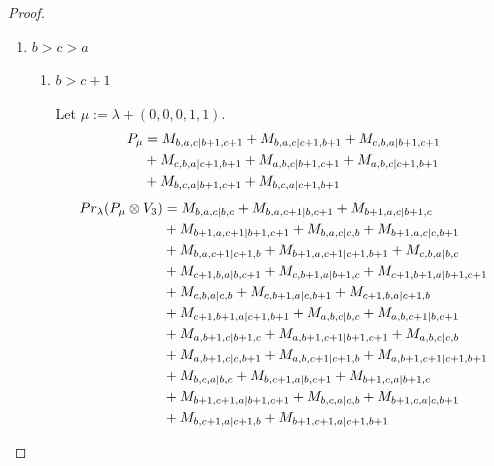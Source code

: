 \begin{proof}
\begin{enumerate}
  \item $b>c>a$
    \begin{enumerate}
      \item $b>c+1$ \par
        Let $\mu:=\lambda + (0,0,0,1,1) $.
        \begin{equation}\notag
          \begin{aligned}
            P_\mu &= M_{b,a,c|b+1,c+1}
+ M_{b,a,c|c+1,b+1}
+ M_{c,b,a|b+1,c+1}\\
                                            &
+ M_{c,b,a|c+1,b+1}
+ M_{a,b,c|b+1,c+1}
+ M_{a,b,c|c+1,b+1}\\
                                            &
+ M_{b,c,a|b+1,c+1}
+ M_{b,c,a|c+1,b+1}
          \end{aligned}
        \end{equation}
        \begin{equation}\notag
          \begin{aligned}
            Pr_{\lambda}(P_\mu \otimes V_{3}) &=
M_{b,a,c|b,c}
+ M_{b,a,c+1|b,c+1}
+ M_{b+1,a,c|b+1,c}\\
                                            &
+ M_{b+1,a,c+1|b+1,c+1}
+ M_{b,a,c|c,b}
+ M_{b+1,a,c|c,b+1}\\
                                            &
+ M_{b,a,c+1|c+1,b}
+ M_{b+1,a,c+1|c+1,b+1}
+ M_{c,b,a|b,c}\\
                                            &
+ M_{c+1,b,a|b,c+1}
+ M_{c,b+1,a|b+1,c}
+ M_{c+1,b+1,a|b+1,c+1}\\
                                            &
+ M_{c,b,a|c,b}
+ M_{c,b+1,a|c,b+1}
+ M_{c+1,b,a|c+1,b}\\
                                            &
+ M_{c+1,b+1,a|c+1,b+1}
+ M_{a,b,c|b,c}
+ M_{a,b,c+1|b,c+1}\\
                                            &
+ M_{a,b+1,c|b+1,c}
+ M_{a,b+1,c+1|b+1,c+1}
+ M_{a,b,c|c,b}\\
                                            &
+ M_{a,b+1,c|c,b+1}
+ M_{a,b,c+1|c+1,b}
+ M_{a,b+1,c+1|c+1,b+1}\\
                                            &
+ M_{b,c,a|b,c}
+ M_{b,c+1,a|b,c+1}
+ M_{b+1,c,a|b+1,c}\\
                                            &
+ M_{b+1,c+1,a|b+1,c+1}
+ M_{b,c,a|c,b}
+ M_{b+1,c,a|c,b+1}\\
                                            &
+ M_{b,c+1,a|c+1,b}
+ M_{b+1,c+1,a|c+1,b+1} \\

\end{aligned}
\end{equation}
\end{enumerate}
\end{enumerate}
\end{proof}
